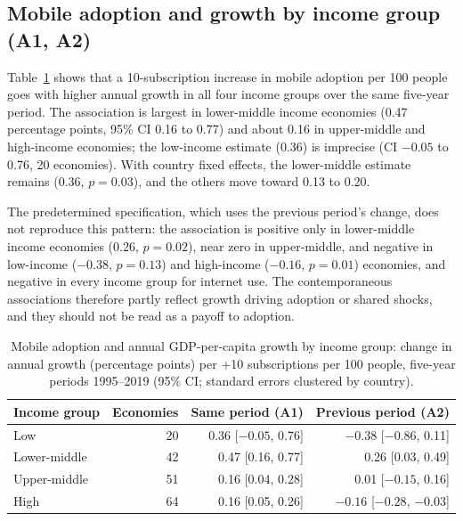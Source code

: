 \subsection{Mobile adoption and growth by income group (A1, A2)}
Table~\ref{tab:panel} shows that a 10-subscription increase in mobile adoption per 100 people goes with higher annual growth in all four income groups over the same five-year period. The association is largest in lower-middle income economies (0.47 percentage points, 95\% CI 0.16 to 0.77) and about 0.16 in upper-middle and high-income economies; the low-income estimate (0.36) is imprecise (CI $-0.05$ to 0.76, 20 economies). With country fixed effects, the lower-middle estimate remains (0.36, $p=0.03$), and the others move toward 0.13 to 0.20.

The predetermined specification, which uses the previous period's change, does not reproduce this pattern: the association is positive only in lower-middle income economies (0.26, $p=0.02$), near zero in upper-middle, and negative in low-income ($-0.38$, $p=0.13$) and high-income ($-0.16$, $p=0.01$) economies, and negative in every income group for internet use. The contemporaneous associations therefore partly reflect growth driving adoption or shared shocks, and they should not be read as a payoff to adoption.

\begin{table}[ht]\centering\small
\caption{Mobile adoption and annual GDP-per-capita growth by income group: change in annual growth (percentage points) per +10 subscriptions per 100 people, five-year periods 1995--2019 (95\% CI; standard errors clustered by country).}\label{tab:panel}
\begin{tabular}{@{}lrrr@{}}\toprule
Income group & Economies & Same period (A1) & Previous period (A2)\\\midrule
Low & 20 & 0.36 [$-0.05$, 0.76] & $-0.38$ [$-0.86$, 0.11]\\
Lower-middle & 42 & 0.47 [0.16, 0.77] & 0.26 [0.03, 0.49]\\
Upper-middle & 51 & 0.16 [0.04, 0.28] & 0.01 [$-0.15$, 0.16]\\
High & 64 & 0.16 [0.05, 0.26] & $-0.16$ [$-0.28$, $-0.03$]\\\bottomrule
\end{tabular}\end{table}

